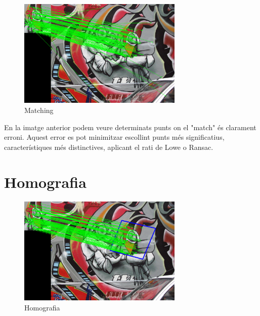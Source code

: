 	\begin{figure}[H]
		\centering
		\includegraphics[width=0.7\textwidth]{images/matching}
		\caption{Matching}
	\end{figure}


	En la imatge anterior podem veure determinats punts on el "match" és clarament erroni. Aquest error es pot minimitzar escollint punts més significatius, característiques més distinctives, aplicant el rati
	de Lowe o Ransac.

\section{Homografia}

	\begin{figure}[H]
		\centering
		\includegraphics[width=0.7\textwidth]{images/homography}
		\caption{Homografia}
	\end{figure}
